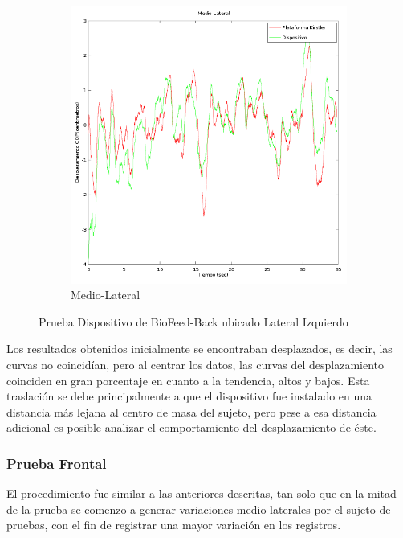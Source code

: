 \documentclass[12pt,a4paper]{article}
\newcommand{\nombreDispositivo}{Dispositivo de BioFeed-Back }
\begin{document}
\begin{figure}[H]
\begin{subfigure}{.5\textwidth}
			\includegraphics[width=1\linewidth]{images/pruebas/LateralIzquierdo/Medio-Lateral}
			\caption{Medio-Lateral}
			\label{fig:medioLateralIzquierdo}
		\end{subfigure}
		\caption{Prueba \nombreDispositivo ubicado Lateral Izquierdo}
		\label{fig:pruebaLateralIzquierdo}
	\end{figure}
	
	Los resultados obtenidos inicialmente se encontraban desplazados, es decir, las curvas no coincidían, pero al centrar los datos, las curvas del desplazamiento coinciden en gran porcentaje en cuanto a la tendencia, altos y bajos.
	Esta traslación se debe principalmente a que el dispositivo fue instalado en una distancia más lejana al centro de masa del sujeto, pero pese a esa distancia adicional es posible analizar el comportamiento del desplazamiento de éste.
	
\newpage
\subsubsection{Prueba Frontal}
El procedimiento fue similar a las anteriores descritas, tan solo que en la mitad de la prueba se comenzo a generar variaciones medio-laterales por el sujeto de pruebas, con el fin de registrar una mayor variación en los registros.
\end{document}
